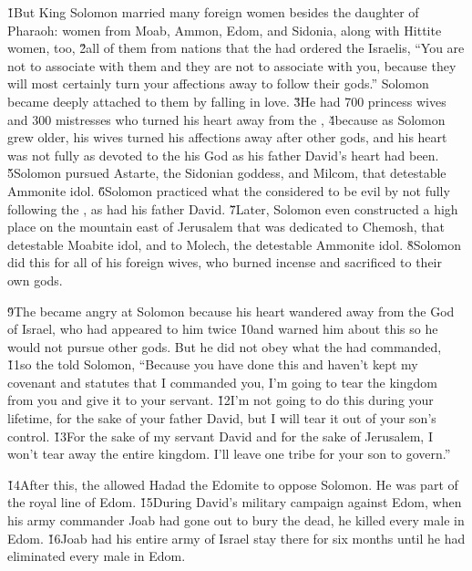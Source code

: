 \v{1}But King Solomon married many foreign women besides the daughter of Pharaoh: women from Moab, Ammon, Edom, and Sidonia, along with Hittite women, too, \v{2}all of them from nations that the  had ordered the Israelis, ``You are not to associate with them and they are not to associate with you, because they will most certainly turn your affections away to follow their gods.'' Solomon became deeply attached to them by falling in love. \v{3}He had 700 princess wives and 300 mistresses who turned his heart away from the , \v{4}because as Solomon grew older, his wives turned his affections away after other gods, and his heart was not fully as devoted to the  his God as his father David's heart had been. \v{5}Solomon pursued Astarte, the Sidonian goddess, and Milcom, that detestable Ammonite idol. \v{6}Solomon practiced what the  considered to be evil by not fully following the , as had his father David. \v{7}Later, Solomon even constructed a high place on the mountain east of Jerusalem that was dedicated to Chemosh, that detestable Moabite idol, and to Molech, the detestable Ammonite idol. \v{8}Solomon did this for all of his foreign wives, who burned incense and sacrificed to their own gods.

\v{9}The  became angry at Solomon because his heart wandered away from the  God of Israel, who had appeared to him twice \v{10}and warned him about this so he would not pursue other gods. But he did not obey what the  had commanded, \v{11}so the  told Solomon, ``Because you have done this and haven't kept my covenant and statutes that I commanded you, I'm going to tear the kingdom from you and give it to your servant. \v{12}I'm not going to do this during your lifetime, for the sake of your father David, but I will tear it out of your son's control. \v{13}For the sake of my servant David and for the sake of Jerusalem, I won't tear away the entire kingdom. I'll leave one tribe for your son to govern.''

\v{14}After this, the  allowed Hadad the Edomite to oppose Solomon. He was part of the royal line of Edom. \v{15}During David's military campaign against Edom, when his army commander Joab had gone out to bury the dead, he killed every male in Edom. \v{16}Joab had his entire army of Israel stay there for six months until he had eliminated every male in Edom.

